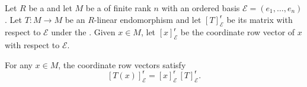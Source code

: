 \begin{lemma} \label{lemma:matrix_of_an_endomorphism_acts_on_coordinate_row_vectors}
    Let $R$ be a  and let $M$ be a  of finite rank $n$ with an ordered basis $\mathcal{E} = (e_1,\ldots,e_n)$. Let $T: M \to M$ be an $R$-linear endomorphism and let $[T]_\mathcal{E}^{\mathsf{r}}$ be its matrix with respect to $\mathcal{E}$ under the . Given $x \in M$, let $[x]_\mathcal{E}^{\mathsf{r}}$ be the coordinate row vector of $x$ with respect to $\mathcal{E}$.

    For any $x \in M$, the coordinate row vectors satisfy
    $$[T(x)]_\mathcal{E}^{\mathsf{r}} = [x]_\mathcal{E}^{\mathsf{r}} \, [T]_\mathcal{E}^{\mathsf{r}}.$$
\end{lemma}
